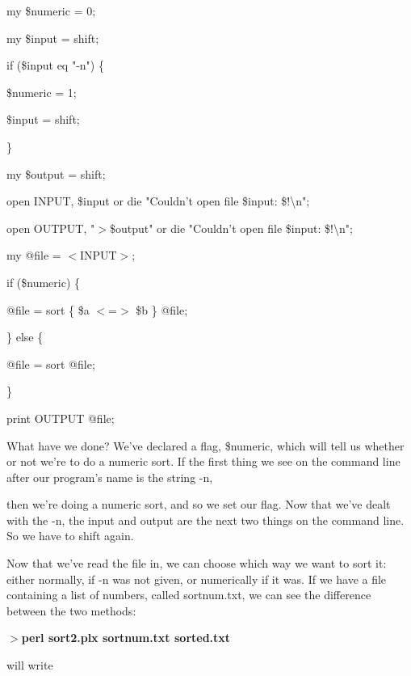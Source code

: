 \documentclass[a4paper,11pt]{book}
\begin{document}
\noindent 

\noindent my \$numeric = 0;

\noindent my \$input = shift;

\noindent if (\$input eq "-n") \{

\noindent \$numeric = 1;

\noindent \$input = shift;

\noindent \}

\noindent my \$output = shift;

\noindent 

\noindent open INPUT, \$input or die "Couldn't open file \$input: \$!\textbackslash n";

\noindent open OUTPUT, "$>$\$output" or die "Couldn't open file \$input: \$!\textbackslash n";

\noindent 

\noindent my @file = $<$INPUT$>$;

\noindent if (\$numeric) \{

\noindent @file = sort \{ \$a $<$=$>$ \$b \} @file;

\noindent \} else \{

\noindent @file = sort @file;

\noindent \}

\noindent 

\noindent print OUTPUT @file;

\noindent 

\noindent What have we done? We've declared a flag, \$numeric, which will tell us whether or not we're to do a numeric sort. If the first thing we see on the command line after our program's name is the string -n,

\noindent then we're doing a numeric sort, and so we set our flag. Now that we've dealt with the -n, the input and output are the next two things on the command line. So we have to shift again.

\noindent 

\noindent Now that we've read the file in, we can choose which way we want to sort it: either normally, if -n was not given, or numerically if it was. If we have a file containing a list of numbers, called sortnum.txt, we can see the difference between the two methods:

\noindent 

\noindent $>$\textbf{perl sort2.plx sortnum.txt sorted.txt}

\noindent 

\noindent will write
\end{document}
